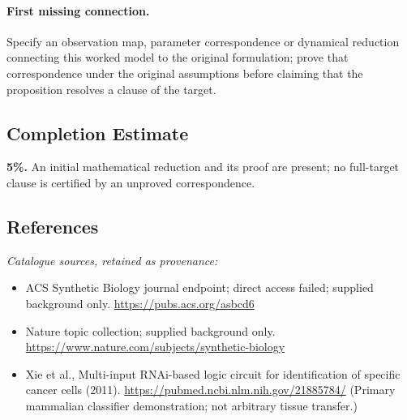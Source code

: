 \documentclass[11pt]{article}
\begin{document}
\paragraph{First missing connection.} Specify an observation map, parameter correspondence or dynamical reduction connecting this worked model to the original formulation; prove that correspondence under the original assumptions before claiming that the proposition resolves a clause of the target.
\subsection{Completion Estimate}
\textbf{5\%.} An initial mathematical reduction and its proof are present; no full-target clause is certified by an unproved correspondence.
\subsection{References}
\noindent\emph{Catalogue sources, retained as provenance:}
\begin{itemize}
\item ACS Synthetic Biology journal endpoint; direct access failed; supplied background only. \url{https://pubs.acs.org/asbcd6}
\item Nature topic collection; supplied background only. \url{https://www.nature.com/subjects/synthetic-biology}
\item Xie et al., Multi-input RNAi-based logic circuit for identification of specific cancer cells (2011). \url{https://pubmed.ncbi.nlm.nih.gov/21885784/} (Primary mammalian classifier demonstration; not arbitrary tissue transfer.)
\end{itemize}
\clearpage


\appendix
\end{document}
